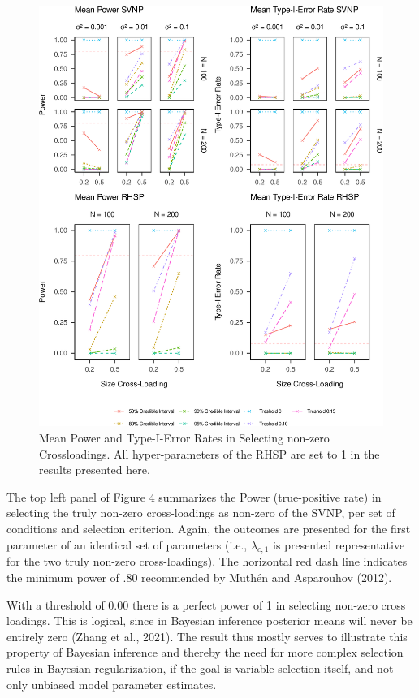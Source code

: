\documentclass[
  man, donotrepeattitle,floatsintext]{apa6}
\begin{document}
\begin{figure}
\centering
\includegraphics{JMBKoch_thesis_files/figure-latex/unnamed-chunk-5-1.pdf}
\caption{\label{fig:unnamed-chunk-5}Mean Power and Type-I-Error Rates in Selecting non-zero Crossloadings. All hyper-parameters of the RHSP are set to 1 in the results presented here.}
\end{figure}

The top left panel of Figure 4 summarizes the Power (true-positive rate) in selecting the truly non-zero cross-loadings as non-zero of the SVNP, per set of conditions and selection criterion. Again, the outcomes are presented for the first parameter of an identical set of parameters (i.e., \(\lambda_{c,1}\) is presented representative for the two truly non-zero cross-loadings). The horizontal red dash line indicates the minimum power of .80 recommended by Muthén and Asparouhov (2012).

With a threshold of 0.00 there is a perfect power of 1 in selecting non-zero cross loadings. This is logical, since in Bayesian inference posterior means will never be entirely zero (Zhang et al., 2021). The result thus mostly serves to illustrate this property of Bayesian inference and thereby the need for more complex selection rules in Bayesian regularization, if the goal is variable selection itself, and not only unbiased model parameter estimates.
\end{document}
